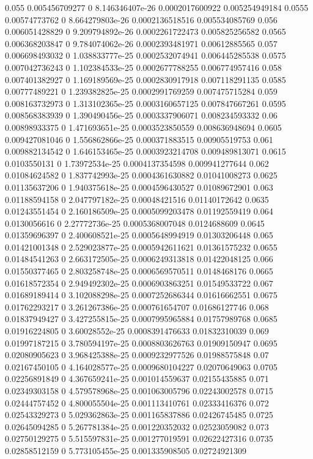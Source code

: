 {0.055 0.005456709277 0 8.146346407e-26 0.0002017600922 0.005254949184
0.0555 0.00574773762 0 8.664279803e-26 0.0002136518516 0.005534085769
0.056 0.006051428829 0 9.209794892e-26 0.0002261722473 0.005825256582
0.0565 0.006368203847 0 9.784074062e-26 0.0002393481971 0.00612885565
0.057 0.006698493032 0 1.038833777e-25 0.0002532074941 0.006445285538
0.0575 0.007042736243 0 1.102384533e-25 0.0002677788255 0.006774957416
0.058 0.007401382927 0 1.169189569e-25 0.0002830917918 0.007118291135
0.0585 0.00777489221 0 1.239382825e-25 0.0002991769259 0.007475715284
0.059 0.008163732973 0 1.313102365e-25 0.0003160657125 0.007847667261
0.0595 0.008568383939 0 1.390490456e-25 0.0003337906071 0.008234593332
0.06 0.00898933375 0 1.471693651e-25 0.0003523850559 0.008636948694
0.0605 0.009427081046 0 1.556862866e-25 0.000371883515 0.00905519753
0.061 0.009882134542 0 1.646153465e-25 0.0003923214708 0.009489813071
0.0615 0.0103550131 0 1.73972534e-25 0.0004137354598 0.009941277644
0.062 0.01084624582 0 1.837742993e-25 0.0004361630882 0.01041008273
0.0625 0.01135637206 0 1.940375618e-25 0.0004596430527 0.01089672901
0.063 0.01188594158 0 2.047797182e-25 0.00048421516 0.01140172642
0.0635 0.01243551454 0 2.160186509e-25 0.0005099203478 0.01192559419
0.064 0.0130056616 0 2.27772736e-25 0.0005368007048 0.0124688609
0.0645 0.01359696397 0 2.400608521e-25 0.0005648994919 0.01303206448
0.065 0.01421001348 0 2.529023877e-25 0.0005942611621 0.01361575232
0.0655 0.01484541263 0 2.663172505e-25 0.0006249313818 0.01422048125
0.066 0.01550377465 0 2.803258748e-25 0.0006569570511 0.0148468176
0.0665 0.01618572354 0 2.949492302e-25 0.0006903863251 0.01549533722
0.067 0.01689189414 0 3.102088298e-25 0.0007252686344 0.01616662551
0.0675 0.01762293217 0 3.261267386e-25 0.000761654707 0.01686127746
0.068 0.01837949427 0 3.427255815e-25 0.0007995965884 0.01757989768
0.0685 0.01916224805 0 3.60028552e-25 0.0008391476633 0.01832310039
0.069 0.01997187215 0 3.780594197e-25 0.0008803626763 0.01909150947
0.0695 0.02080905623 0 3.968425388e-25 0.0009232977526 0.01988575848
0.07 0.02167450105 0 4.164028577e-25 0.0009680104227 0.02070649063
0.0705 0.02256891849 0 4.367659241e-25 0.001014559637 0.02155435885
0.071 0.02349303158 0 4.579578968e-25 0.001063005796 0.02243002578
0.0715 0.02444757452 0 4.800055504e-25 0.001113410761 0.02333416376
0.072 0.02543329273 0 5.029362863e-25 0.001165837886 0.02426745485
0.0725 0.02645094285 0 5.267781384e-25 0.001220352032 0.02523059082
0.073 0.02750129275 0 5.515597831e-25 0.001277019591 0.02622427316
0.0735 0.02858512159 0 5.773105455e-25 0.001335908505 0.02724921309
}
